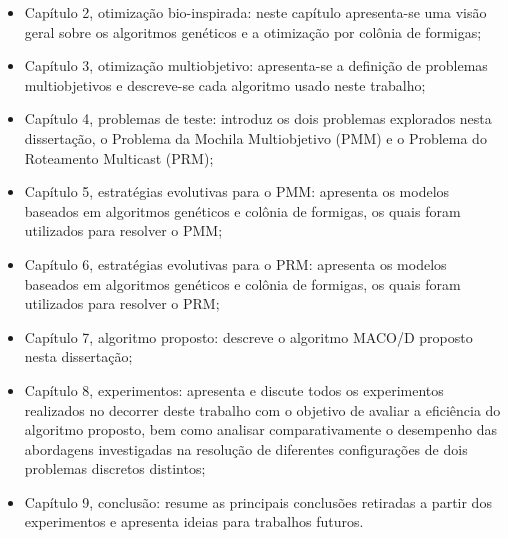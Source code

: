 \begin{itemize}  
	\item Capítulo 2, otimização bio-inspirada: neste capítulo apresenta-se uma visão geral sobre os algoritmos genéticos e a otimização por colônia de formigas;
	\item Capítulo 3, otimização multiobjetivo: apresenta-se a definição de problemas multiobjetivos e descreve-se cada algoritmo usado neste trabalho;
	\item Capítulo 4, problemas de teste: introduz os dois problemas explorados nesta dissertação, o Problema da Mochila Multiobjetivo (PMM) e o Problema do Roteamento Multicast (PRM);
	\item Capítulo 5, estratégias evolutivas para o \ac{PMM}: apresenta os modelos baseados em algoritmos genéticos e colônia de formigas, os quais foram utilizados para resolver o \ac{PMM};
	\item Capítulo 6, estratégias evolutivas para o \ac{PRM}: apresenta os modelos baseados em algoritmos genéticos e colônia de formigas, os quais foram utilizados para resolver o \ac{PRM};
	\item Capítulo 7, algoritmo proposto: descreve o algoritmo \ac{MACO/D} proposto nesta dissertação;
	\item Capítulo 8, experimentos: apresenta e discute todos os experimentos realizados no decorrer deste trabalho com o objetivo de avaliar a eficiência do algoritmo proposto, bem como analisar comparativamente o desempenho das abordagens investigadas na resolução de diferentes configurações de dois problemas discretos distintos;
	\item Capítulo 9, conclusão: resume as principais conclusões retiradas a partir dos experimentos e apresenta ideias para trabalhos futuros.
\end{itemize}